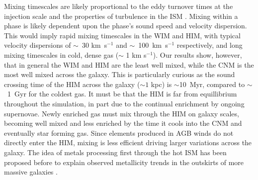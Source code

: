 \documentclass[twocolumn]{aastex61}
\begin{document}
%
%
%

%
%

Mixing timescales are likely proportional to the eddy turnover times at the injection scale \citep{PanScannapieco2010, Colbrook2017} and the properties of turbulence in the ISM \citep{YangKrumholz2012}. Mixing within a phase is likely dependent upon the phase's sound speed and velocity dispersion. This would imply rapid mixing timescales in the WIM and HIM, with typical velocity dispersions of $\sim$~30 km~s$^{-1}$ and $\sim$~100~km~s$^{-1}$ respectively, and long mixing timescales in cold, dense gas ($\sim$ 1 km s$^{-1}$). Our results show, however, that in general the WIM and HIM are the least well mixed, while the CNM is the most well mixed across the galaxy. This is particularly curious as the sound crossing time of the HIM across the galaxy ($\sim 1$ kpc) is $\sim$10~Myr, compared to $\sim$~1~Gyr for the coldest gas. It must be that the HIM is far from equillibrium throughout the simulation, in part due to the continual enrichment by ongoing supernovae. Newly enriched gas must mix through the HIM on galaxy scales, becoming well mixed and less enriched by the time it cools into the CNM and eventually star forming gas. Since elements produced in AGB winds do not directly enter the HIM, mixing is less efficient driving larger variations across the galaxy. The idea of metals processing first through the hot ISM has been proposed before to explain observed metallicity trends in the outskirts of more massive galaxies \citep{Tassis2008,Werk2011}.
\end{document}
